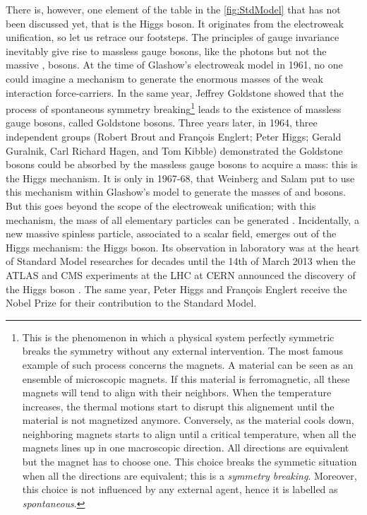 There is, however, one element of the table in the \fig\ref{fig:StdModel} that has not been discussed yet, that is the Higgs boson. It originates from the electroweak unification, so let us retrace our footsteps. The principles of gauge invariance inevitably give rise to massless gauge bosons, like the photons but not the massive \rmWplusminus, \rmZzero bosons. At the time of Glashow's electroweak model in 1961, no one could imagine a mechanism to generate the enormous masses of the weak interaction force-carriers. In the same year, Jeffrey Goldstone showed that the process of spontaneous symmetry breaking\footnote{This is the phenomenon in which a physical system perfectly symmetric breaks the symmetry without any external intervention. The most famous example of such process concerns the magnets. A material can be seen as an ensemble of microscopic magnets. If this material is ferromagnetic, all these magnets will tend to align with their neighbors.  When the temperature increases, the thermal motions start to disrupt this alignement until the material is not magnetized anymore. Conversely, as the material cools down, neighboring magnets starts to align until a critical temperature, when all the magnets lines up in one macroscopic direction. All directions are equivalent but the magnet has to choose one. This choice breaks the symmetic situation when all the directions are equivalent; this is a \textit{symmetry breaking}. Moreover, this choice is not influenced by any external agent, hence it is labelled as \textit{spontaneous}.\label{footnote:SpontaneousSymmetryBreaking}} leads to the existence of massless gauge bosons, called Goldstone bosons. Three years later, in 1964, three independent groups (Robert Brout and François Englert; Peter Higgs; Gerald Guralnik, Carl Richard Hagen, and Tom Kibble) demonstrated the Goldstone bosons could be absorbed by the massless gauge bosons to acquire a mass: this is the Higgs mechanism. It is only in 1967-68, that Weinberg and Salam put to use this mechanism within Glashow's model to generate the masses of \rmWplusminus and \rmZzero bosons. But this goes beyond the scope of the electroweak unification; with this mechanism, the mass of all elementary particles can be generated \cite{s.glashowInteractionsJourneyMind1990}. Incidentally, a new massive spinless particle, associated to a scalar field, emerges out of the Higgs mechanism: the Higgs boson. Its observation in laboratory was at the heart of Standard Model researches for decades until the 14th of March 2013 when the ATLAS and CMS experiments at the LHC at CERN announced the discovery of the Higgs boson \cite{cernNewResultsIndicate2023}\cite{kibbleEnglertBroutHiggsGuralnikHagenKibbleMechanismHistory2009}. The same year, Peter Higgs and François Englert receive the Nobel Prize for their contribution to the Standard Model.


